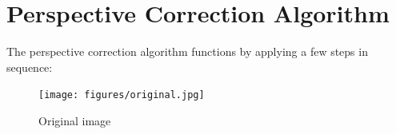 \documentclass[runningheads,a4paper]{llncs}
\begin{document}
\section{Perspective Correction Algorithm}

The perspective correction algorithm functions by applying a few steps in sequence:

\begin{figure}[htbm]
  \texttt{[image: figures/original.jpg]}
  \caption{Original image}\label{fig:original}
\end{figure}

\begin{figure}[htbm]


\end{figure}
\end{document}
